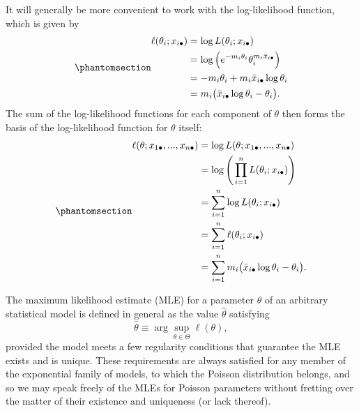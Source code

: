\documentclass[
  12pt]{article}
\begin{document}
It will generally be more convenient to work with the log-likelihood
function, which is given by \begin{equation}\phantomsection\label{eq-4}{
\begin{aligned}
\ell(\theta_i; x_{i\bullet}) &= \log L(\theta_i; x_{i\bullet}) \\
                           &= \log \Big(e^{-m_i\theta_i}\theta_i^{m_i\bar{x}_{i\bullet}}\Big) \\
                           &= -m_i\theta_i + m_i \bar{x}_{i\bullet} \log \theta_i \\
                           &=  m_i\big(\bar{x}_{i\bullet} \log\theta_i - \theta_i \big).
\end{aligned}
}\end{equation} The sum of the log-likelihood functions for each
component of \(\theta\) then forms the basis of the log-likelihood
function for \(\theta\) itself:
\begin{equation}\phantomsection\label{eq-5}{
\begin{aligned}
\ell(\theta; x_{1\bullet}, ..., x_{n\bullet}) &= \log L(\theta; x_{1\bullet}, ..., x_{n\bullet}) \\
                                              &= \log \Bigg(\prod_{i=1}^n L(\theta_i; x_{i\bullet})\Bigg) \\
                                              &= \sum_{i=1}^n \log L(\theta_i; x_{i\bullet}) \\
                                              &= \sum_{i=1}^n \ell(\theta_i; x_{i\bullet}) \\
                                              &= \sum_{i=1}^n m_i\big(\bar{x}_{i\bullet} \log\theta_i - \theta_i \big).
\end{aligned}
}\end{equation}

The maximum likelihood estimate (MLE) for a parameter \(\theta\) of an
arbitrary statistical model is defined in general as the value
\(\hat{\theta}\) satisfying
\[\hat{\theta} \equiv\arg\sup_{\theta \in \Theta} \ell(\theta),\]
provided the model meets a few regularity conditions that guarantee the
MLE exists and is unique. These requirements are always satisfied for
any member of the exponential family of models, to which the Poisson
distribution belongs, and so we may speak freely of the MLEs for Poisson
parameters without fretting over the matter of their existence and
uniqueness (or lack thereof).
\end{document}
